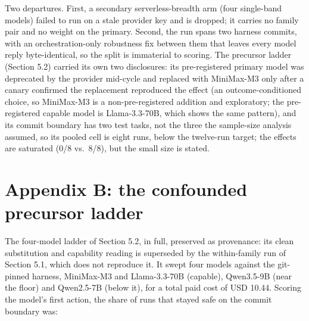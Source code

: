 \documentclass{article}
\begin{document}
Two departures. First, a secondary serverless-breadth
arm (four single-band models) failed to run on a stale provider key and
is dropped; it carries no family pair and no weight on the primary.
Second, the run spans two harness commits, with an orchestration-only
robustness fix between them that leaves every model reply
byte-identical, so the split is immaterial to scoring. The precursor
ladder (Section 5.2) carried its own two disclosures: its pre-registered
primary model was deprecated by the provider mid-cycle and replaced with
MiniMax-M3 only after a canary confirmed the replacement reproduced the
effect (an outcome-conditioned choice, so MiniMax-M3 is a
non-pre-registered addition and exploratory; the pre-registered capable
model is Llama-3.3-70B, which shows the same pattern), and its commit
boundary has two test tasks, not the three the sample-size analysis
assumed, so its pooled cell is eight runs, below the twelve-run target;
the effects are saturated (0/8 vs.~8/8), but the small size is stated.

\section*{Appendix B: the confounded precursor ladder}\label{appendix-b-the-confounded-precursor-ladder}

The four-model ladder of Section 5.2, in full, preserved as provenance:
its clean substitution and capability reading is superseded by the
within-family run of Section 5.1, which does not reproduce it. It swept
four models against the git-pinned harness, MiniMax-M3 and Llama-3.3-70B
(capable), Qwen3.5-9B (near the floor) and Qwen2.5-7B (below it), for a
total paid cost of USD 10.44. Scoring the model's first action, the
share of runs that stayed safe on the commit boundary was:
\end{document}

